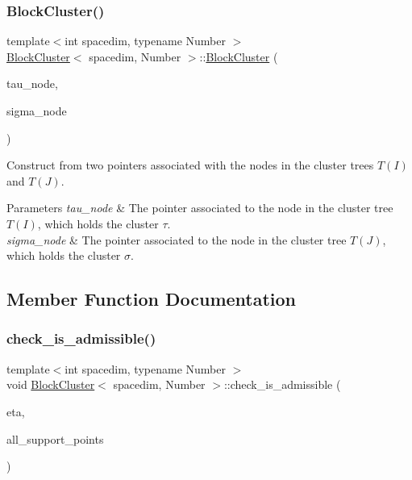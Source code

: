 \subsubsection{\texorpdfstring{Block\+Cluster()}{BlockCluster()}\hspace{0.1cm}{\footnotesize\ttfamily [2/2]}}
{\footnotesize\ttfamily template$<$int spacedim, typename Number $>$ \\
\hyperlink{classBlockCluster}{Block\+Cluster}$<$ spacedim, Number $>$\+::\hyperlink{classBlockCluster}{Block\+Cluster} (\begin{DoxyParamCaption}\item[{typename \hyperlink{classClusterTree}{Cluster\+Tree}$<$ spacedim, Number $>$\+::node\+\_\+pointer\+\_\+type}]{tau\+\_\+node,  }\item[{typename \hyperlink{classClusterTree}{Cluster\+Tree}$<$ spacedim, Number $>$\+::node\+\_\+pointer\+\_\+type}]{sigma\+\_\+node }\end{DoxyParamCaption})}

Construct from two pointers associated with the nodes in the cluster trees $T(I)$ and $T(J)$.


\begin{DoxyParams}{Parameters}
{\em tau\+\_\+node} & The pointer associated to the node in the cluster tree $T(I)$, which holds the cluster $\tau$. \\
\hline
{\em sigma\+\_\+node} & The pointer associated to the node in the cluster tree $T(J)$, which holds the cluster $\sigma$. \\
\hline
\end{DoxyParams}


\subsection{Member Function Documentation}
\mbox{\label{classBlockCluster_a1f56a4b4d2c24fe8e78a954e13134ee1}} 
\subsubsection{\texorpdfstring{check\+\_\+is\+\_\+admissible()}{check\_is\_admissible()}\hspace{0.1cm}{\footnotesize\ttfamily [1/2]}}
{\footnotesize\ttfamily template$<$int spacedim, typename Number $>$ \\
void \hyperlink{classBlockCluster}{Block\+Cluster}$<$ spacedim, Number $>$\+::check\+\_\+is\+\_\+admissible (\begin{DoxyParamCaption}\item[{Number}]{eta,  }\item[{const std\+::vector$<$ Point$<$ spacedim, Number $>$$>$ \&}]{all\+\_\+support\+\_\+points }\end{DoxyParamCaption})}

